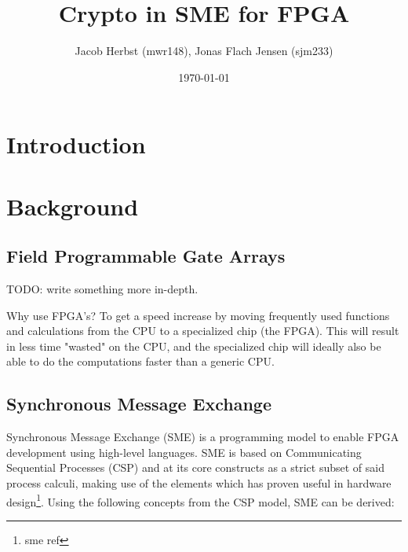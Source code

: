 \documentclass[a4paper]{article}
\author{Jacob Herbst (mwr148), Jonas Flach Jensen (sjm233)}
\date{\today}
\title{Crypto in SME for FPGA}
\begin{document}
\maketitle
\tableofcontents

\newpage
\section{Introduction}
\label{sec:orgf0f5fa7}

\section{Background}
\label{sec:orga02c345}

\subsection{Field Programmable Gate Arrays}
\label{sec:org4fb8f48}
TODO: write something more in-depth.

Why use FPGA's? To get a speed increase by moving frequently used functions and calculations from the CPU to a specialized chip (the FPGA).
This will result in less time "wasted" on the CPU, and the specialized chip will ideally also be able to do the computations faster than a generic CPU.
\subsection{Synchronous Message Exchange}
\label{sec:orgaec27e9}
Synchronous Message Exchange (SME) is a programming model to enable FPGA development using high-level languages. SME is based on Communicating Sequential Processes (CSP) and at its core constructs as a strict subset of said process calculi, making use of the elements which has proven useful in hardware design\cite{sme}\footnote{sme ref}. Using the following concepts from the CSP model, SME can be derived:
\end{document}
